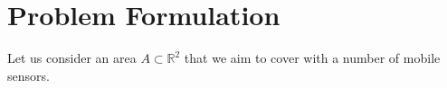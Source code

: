 \documentclass{iacas}
\newcommand{\rsqr}{\mathbb{R}^2}
\newcommand{\bmat}[1]{\begin{bmatrix}#1\end{bmatrix}}
\newcommand{\conp}[1]{c_{#1}\left(t\right)}
\begin{document}
\section{Problem Formulation}
Let us consider an area $A \subset \rsqr$ that we aim to cover with a number of mobile sensors. %
\end{document}
